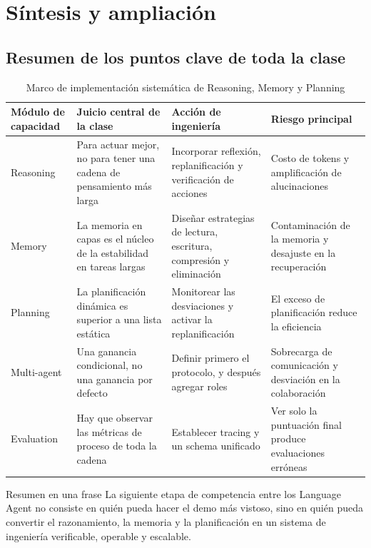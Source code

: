 \section{Síntesis y ampliación}

\subsection{Resumen de los puntos clave de toda la clase}
\begin{table}[H]
\centering
\begin{tabular}{p{2.5cm}p{3.7cm}p{3.8cm}p{2.6cm}}
\toprule
\textbf{Módulo de capacidad} & \textbf{Juicio central de la clase} & \textbf{Acción de ingeniería} & \textbf{Riesgo principal} \\
\midrule
Reasoning & Para actuar mejor, no para tener una cadena de pensamiento más larga & Incorporar reflexión, replanificación y verificación de acciones & Costo de tokens y amplificación de alucinaciones \\
Memory & La memoria en capas es el núcleo de la estabilidad en tareas largas & Diseñar estrategias de lectura, escritura, compresión y eliminación & Contaminación de la memoria y desajuste en la recuperación \\
Planning & La planificación dinámica es superior a una lista estática & Monitorear las desviaciones y activar la replanificación & El exceso de planificación reduce la eficiencia \\
Multi-agent & Una ganancia condicional, no una ganancia por defecto & Definir primero el protocolo, y después agregar roles & Sobrecarga de comunicación y desviación en la colaboración \\
Evaluation & Hay que observar las métricas de proceso de toda la cadena & Establecer tracing y un schema unificado & Ver solo la puntuación final produce evaluaciones erróneas \\
\bottomrule
\end{tabular}
\caption{Marco de implementación sistemática de Reasoning, Memory y Planning}
\end{table}

\begin{importantbox}{Resumen en una frase}
La siguiente etapa de competencia entre los Language Agent no consiste en quién pueda hacer el demo más vistoso, sino en quién pueda convertir el razonamiento, la memoria y la planificación en un sistema de ingeniería verificable, operable y escalable.
\end{importantbox}

